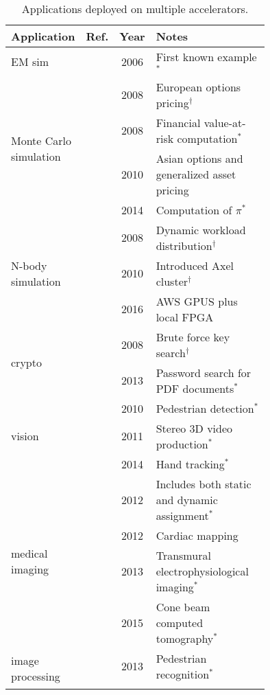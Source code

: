 \begin{table}[htp]
\centering
\caption{Applications deployed on multiple accelerators.}
\label{tbl:apps}
\vspace{0.1in}
\begin{tabular}{p{0.15\linewidth} | c | c | p{0.6\linewidth}}
Application & Ref. & Year & Notes \\ \hline
EM sim & \cite{kdh+06} & 2006 & First known example$^*$ \\ \hline
\multirow{4}{\linewidth}{Monte Carlo simulation} & \cite{ytt+08} & 2008 & European options pricing$^\dag$  \\ \cline{2-4}
 & \cite{shsc08} & 2008 & Financial value-at-risk computation$^*$  \\ \cline{2-4}
 & \cite{tttl10} & 2010 & Asian options and generalized asset pricing \\ \cline{2-4}
 & \cite{admb14} & 2014 & Computation of $\pi$$^*$ \\ \hline
\multirow{3}{\linewidth}{N-body simulation} & \cite{ytt+08} & 2008 & Dynamic workload distribution$^\dag$ \\ \cline{2-4}
 & \cite{tl10} & 2010 & Introduced Axel cluster$^\dag$ \\ \cline{2-4}
 & \cite{sm16} & 2016 & AWS GPUS plus local FPGA \\ \hline
\multirow{2}{\linewidth}{crypto} & \cite{ytt+08} & 2008 & Brute force key search$^\dag$ \\ \cline{2-4}
 & \cite{dfg+13} & 2013 & Password search for PDF documents$^*$ \\ \hline
\multirow{3}{*}{vision} & \cite{bkdb10} & 2010 & Pedestrian detection$^*$ \\ \cline{2-4}
 & \cite{ghgb11} & 2011 & Stereo 3D video production$^*$ \\ \cline{2-4}
 & \cite{brf14} & 2014 & Hand tracking$^*$ \\ \hline
\multirow{4}{\linewidth}{medical imaging} & \cite{szb+12} & 2012 & Includes both static and dynamic assignment$^*$ \\ \cline{2-4}
 & \cite{mjk12} & 2012 & Cardiac mapping \\ \cline{2-4}
 & \cite{sll13} & 2013 & Transmural electrophysiological imaging$^*$ \\ \cline{2-4}
 & \cite{rpm+15} & 2015 & Cone beam computed tomography$^*$ \\ \hline
\multirow{5}{\linewidth}{image processing} & \cite{dbd+13} & 2013 & Pedestrian recognition$^*$ \\ \cline{2-4}
$$
\end{tabular}
\end{table}
